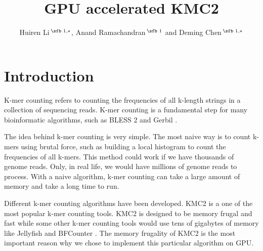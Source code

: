 \documentclass{bioinfo}
\begin{document}

\title[short Title]{GPU accelerated KMC2}
\author[]{Huiren Li\,$^{\text{\sfb 1,}*}$, Anand Ramachandran\,$^{\text{\sfb 1}}$ and
Deming Chen\,$^{\text{\sfb 1,}*}$}
\address{$^{\text{\sf 1}}$Department of Electrical and Computer Engineering, University of
Illinois at Urbana-Champaign, Urbana, IL 61801, USA}

\corresp{}




\maketitle

\section{Introduction}

K-mer counting refers to counting the frequencies of all k-length strings in a collection
of sequencing reads.
K-mer counting is a fundamental step for many bioinformatic algorithms, such as BLESS 2
\citep{Heo16} and Gerbil \citep{Mar17}.

The idea behind k-mer counting is very simple. The most naive way is to count k-mers using
brutal force, such as building a local histogram to count the frequencies of all k-mers.
This method could work if we have thousands of genome reads. Only, in real life, we would
have millions of genome reads to process. With a naive algorithm, k-mer counting can take
a large amount of memory and take a long time to run.

Different k-mer counting algorithms have been developed.
KMC2 \citep{Seb14} is a one of the most popular k-mer counting tools. KMC2 is designed to
be memory frugal and fast while some other k-mer counting tools would use tens of
gigabytes of memory like Jellyfish \citep{Mar11} and BFCounter \citep{Mel11}.
The memory frugality of KMC2 is the most important reason why we chose to implement this
particular algorithm on GPU.
\end{document}
